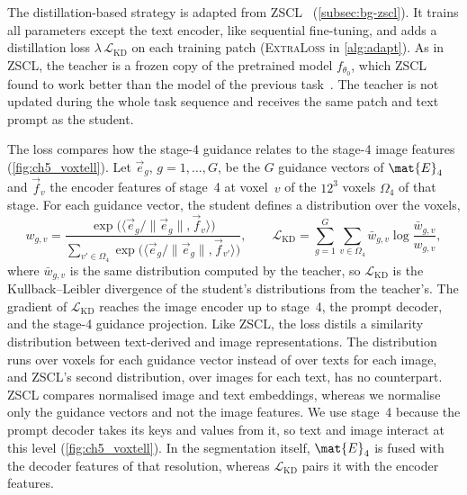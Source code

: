 The distillation-based strategy is adapted from ZSCL~\cite{zheng2023preventingzeroshottransferdegradation} (\cref{subsec:bg-zscl}).
It trains all parameters except the text encoder, like sequential fine-tuning, and adds a distillation loss $\lambda\,\mathcal{L}_{\mathrm{KD}}$ on each training patch (\textsc{ExtraLoss} in \cref{alg:adapt}).
As in ZSCL, the teacher is a frozen copy of the pretrained model $f_{\theta_0}$, which ZSCL found to work better than the model of the previous task~\cite[Table~1d]{zheng2023preventingzeroshottransferdegradation}.
The teacher is not updated during the whole task sequence and receives the same patch and text prompt as the student.

The loss compares how the stage-4 guidance relates to the stage-4 image features (\cref{fig:ch5_voxtell}).
Let $\vec{e}_g$, $g = 1, \dots, G$, be the $G$ guidance vectors of $\mat{E}_4$ and $\vec{f}_v$ the encoder features of stage~4 at voxel~$v$ of the $12^3$ voxels $\Omega_4$ of that stage.
For each guidance vector, the student defines a distribution over the voxels,
\begin{equation}
w_{g,v} = \frac{\exp\big(\langle \vec{e}_g / \|\vec{e}_g\|, \vec{f}_v \rangle\big)}{\sum_{v' \in \Omega_4} \exp\big(\langle \vec{e}_g / \|\vec{e}_g\|, \vec{f}_{v'} \rangle\big)},
\qquad
\mathcal{L}_{\mathrm{KD}} = \sum_{g=1}^{G} \sum_{v \in \Omega_4} \bar{w}_{g,v} \log \frac{\bar{w}_{g,v}}{w_{g,v}},
\label{eq:method-kd}
\end{equation}
where $\bar{w}_{g,v}$ is the same distribution computed by the teacher, so $\mathcal{L}_{\mathrm{KD}}$ is the Kullback--Leibler divergence of the student's distributions from the teacher's.
The gradient of $\mathcal{L}_{\mathrm{KD}}$ reaches the image encoder up to stage~4, the prompt decoder, and the stage-4 guidance projection.
Like ZSCL, the loss distils a similarity distribution between text-derived and image representations.
The distribution runs over voxels for each guidance vector instead of over texts for each image, and ZSCL's second distribution, over images for each text, has no counterpart.
ZSCL compares normalised image and text embeddings, whereas we normalise only the guidance vectors and not the image features.
We use stage~4 because the prompt decoder takes its keys and values from it, so text and image interact at this level (\cref{fig:ch5_voxtell}).
In the segmentation itself, $\mat{E}_4$ is fused with the decoder features of that resolution, whereas $\mathcal{L}_{\mathrm{KD}}$ pairs it with the encoder features.


